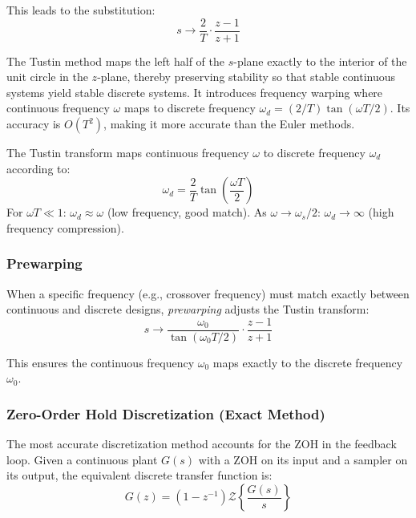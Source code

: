 This leads to the substitution:
\begin{equation}
\boxed{s \rightarrow \frac{2}{T} \cdot \frac{z - 1}{z + 1}}
\label{eq:tustin_substitution}
\end{equation}

The Tustin method maps the left half of the $s$-plane exactly to the interior of the unit circle in the $z$-plane, thereby preserving stability so that stable continuous systems yield stable discrete systems. It introduces frequency warping where continuous frequency $\omega$ maps to discrete frequency $\omega_d = (2/T)\tan(\omega T/2)$. Its accuracy is $O(T^2)$, making it more accurate than the Euler methods.

\begin{tcolorbox}[colback=blue!5!white,colframe=blue!75!black,sharp corners,title=Tustin Frequency Warping]
The Tustin transform maps continuous frequency $\omega$ to discrete frequency $\omega_d$ according to:
\begin{equation}
\omega_d = \frac{2}{T} \tan\left(\frac{\omega T}{2}\right)
\label{eq:frequency_warping}
\end{equation}
For $\omega T \ll 1$: $\omega_d \approx \omega$ (low frequency, good match).
As $\omega \rightarrow \omega_s/2$: $\omega_d \rightarrow \infty$ (high frequency compression).
\end{tcolorbox}

\subsubsection{Prewarping}

When a specific frequency (e.g., crossover frequency) must match exactly between continuous and discrete designs, \textit{prewarping} adjusts the Tustin transform:
\begin{equation}
s \rightarrow \frac{\omega_0}{\tan(\omega_0 T / 2)} \cdot \frac{z - 1}{z + 1}
\label{eq:prewarping}
\end{equation}

This ensures the continuous frequency $\omega_0$ maps exactly to the discrete frequency $\omega_0$.

\subsubsection{Zero-Order Hold Discretization (Exact Method)}

The most accurate discretization method accounts for the ZOH in the feedback loop. Given a continuous plant $G(s)$ with a ZOH on its input and a sampler on its output, the equivalent discrete transfer function is:
\begin{equation}
G(z) = (1 - z^{-1}) \mathcal{Z}\left\{ \frac{G(s)}{s} \right\}
\label{eq:zoh_discretization}
\end{equation}


